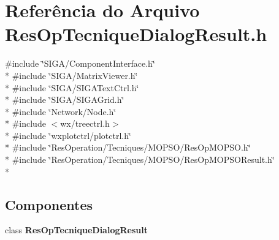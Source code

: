 \section{Referência do Arquivo Res\+Op\+Tecnique\+Dialog\+Result.\+h}
\label{_tecniques_2_res_op_tecnique_dialog_result_8h}
{\ttfamily \#include \char`\"{}S\+I\+G\+A/\+Component\+Interface.\+h\char`\"{}}\\*
{\ttfamily \#include \char`\"{}S\+I\+G\+A/\+Matrix\+Viewer.\+h\char`\"{}}\\*
{\ttfamily \#include \char`\"{}S\+I\+G\+A/\+S\+I\+G\+A\+Text\+Ctrl.\+h\char`\"{}}\\*
{\ttfamily \#include \char`\"{}S\+I\+G\+A/\+S\+I\+G\+A\+Grid.\+h\char`\"{}}\\*
{\ttfamily \#include \char`\"{}Network/\+Node.\+h\char`\"{}}\\*
{\ttfamily \#include $<$wx/treectrl.\+h$>$}\\*
{\ttfamily \#include \char`\"{}wxplotctrl/plotctrl.\+h\char`\"{}}\\*
{\ttfamily \#include \char`\"{}Res\+Operation/\+Tecniques/\+M\+O\+P\+S\+O/\+Res\+Op\+M\+O\+P\+S\+O.\+h\char`\"{}}\\*
{\ttfamily \#include \char`\"{}Res\+Operation/\+Tecniques/\+M\+O\+P\+S\+O/\+Res\+Op\+M\+O\+P\+S\+O\+Result.\+h\char`\"{}}\\*
\subsection*{Componentes}
\begin{DoxyCompactItemize}
\item 
class {\bf Res\+Op\+Tecnique\+Dialog\+Result}
\end{DoxyCompactItemize}
